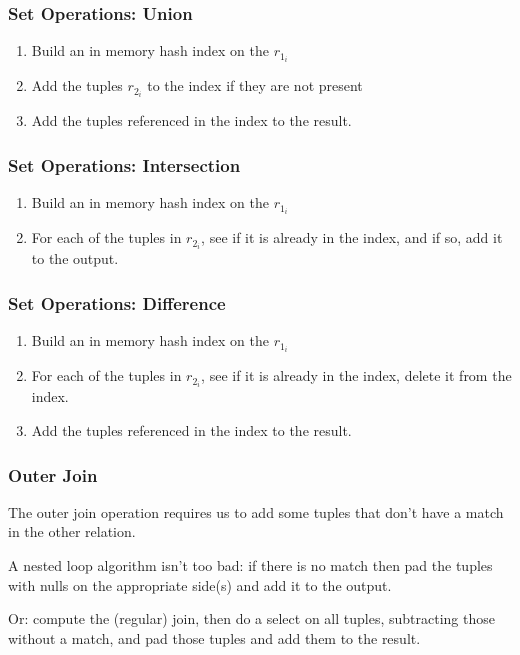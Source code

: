\begin{frame}
\frametitle{Set Operations: Union}

\begin{enumerate}
		\item Build an in memory hash index on the $r_{1_{i}}$
		\item Add the tuples $r_{2_{i}}$ to the index if they are not present
		\item Add the tuples referenced in the index to the result.
	\end{enumerate}

\end{frame}

\begin{frame}
\frametitle{Set Operations: Intersection}
\begin{enumerate}
		\item Build an in memory hash index on the $r_{1_{i}}$
		\item For each of the tuples in $r_{2_{i}}$, see if it is already in the index, and if so, add it to the output.
	\end{enumerate}

\end{frame}

\begin{frame}
\frametitle{Set Operations: Difference}
\begin{enumerate}
		\item Build an in memory hash index on the $r_{1_{i}}$
		\item For each of the tuples in $r_{2_{i}}$, see if it is already in the index, delete it from the index.
		\item Add the tuples referenced in the index to the result.
	\end{enumerate}

\end{frame}

\begin{frame}
\frametitle{Outer Join}

The outer join operation requires us to add some tuples that don't have a match in the other relation. 

A nested loop algorithm isn't too bad: if there is no match then pad the tuples with nulls on the appropriate side(s) and add it to the output.

Or: compute the (regular) join, then do a select on all tuples, subtracting those without a match, and pad those tuples and add them to the result.


\end{frame}


